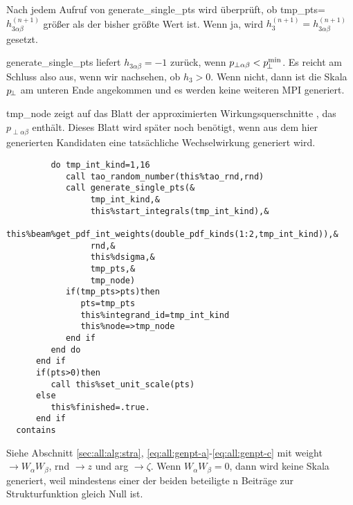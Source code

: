 Nach jedem Aufruf von generate\_single\_pts wird überprüft, ob tmp\_pts=$h_{3\alpha\beta}^{(n+1)}$ größer als der bisher größte Wert ist. Wenn ja, wird $h_3^{(n+1)}=h_{3\alpha\beta}^{(n+1)}$ gesetzt.

generate\_single\_pts liefert $h_{3\alpha\beta}=-1$ zurück, wenn $p_{\perp\alpha\beta}<p_{\!\perp}^{\min}$. Es reicht am Schluss also aus, wenn wir nachsehen, ob $h_3>0$. Wenn nicht, dann ist die Skala $p_{\!\perp}$ am unteren Ende angekommen und es werden keine weiteren MPI generiert.

tmp\_node zeigt auf das Blatt der approximierten Wirkungsquerschnitte , das $p_{\perp\alpha\beta}$ enthält. Dieses Blatt wird später noch benötigt, wenn aus dem hier generierten Kandidaten eine tatsächliche Wechselwirkung generiert wird.
\begin{Verbatim}
         do tmp_int_kind=1,16
            call tao_random_number(this%tao_rnd,rnd)
            call generate_single_pts(&
                 tmp_int_kind,&
                 this%start_integrals(tmp_int_kind),&
                 this%beam%get_pdf_int_weights(double_pdf_kinds(1:2,tmp_int_kind)),&
                 rnd,&
                 this%dsigma,&
                 tmp_pts,&
                 tmp_node)
            if(tmp_pts>pts)then
               pts=tmp_pts
               this%integrand_id=tmp_int_kind
               this%node=>tmp_node
            end if
         end do
      end if
      if(pts>0)then
         call this%set_unit_scale(pts)
      else
         this%finished=.true.
      end if
  contains
\end{Verbatim}
Siehe Abschnitt \ref{sec:all:alg:stra}, \eqref{eq:all:genpt-a}-\eqref{eq:all:genpt-c} mit weight $\rightarrow W_{\alpha}W_{\beta}$,  rnd $\rightarrow z$ und arg $\rightarrow \zeta$. 
Wenn $W_{\alpha}W_{\beta}=0$, dann wird keine Skala generiert, weil mindestens einer der beiden beteiligte
n Beiträge zur Strukturfunktion gleich Null ist.

